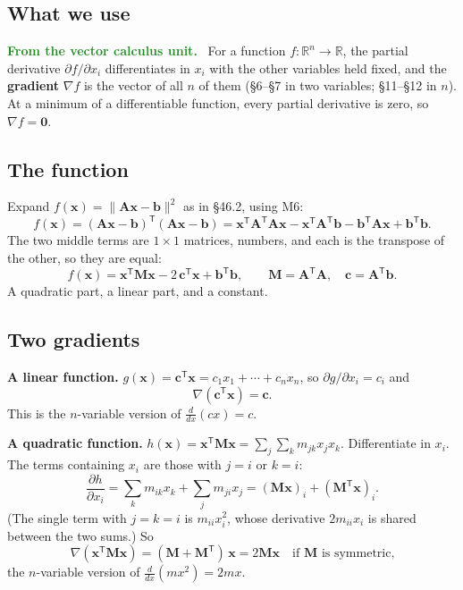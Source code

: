 \documentclass[11pt]{article}
\theoremstyle{plain}
\theoremstyle{definition}
\theoremstyle{remark}
\newcommand{\lookback}[1][the vector unit]{\par\smallskip\noindent
  \textbf{\sffamily\textcolor{ForestGreen}{From #1.}}\ \ignorespaces}
\newcommand{\R}{\mathbb{R}}
\newcommand{\vc}[1]{\mathbf{#1}}
\newcommand{\mt}[1]{\mathbf{#1}}
\newcommand{\norm}[1]{\lVert #1\rVert}
\newcommand{\T}{^{\mathsf{T}}}
\begin{document}
\subsection{What we use}
\lookback[the vector calculus unit] For a function $f:\R^{n}\to\R$, the partial
derivative $\partial f/\partial x_i$ differentiates in $x_i$ with the other
variables held fixed, and the \textbf{gradient} $\nabla f$ is the vector of all
$n$ of them (\S6--\S7 in two variables; \S11--\S12 in $n$). At a minimum of a
differentiable function, every partial derivative is zero, so $\nabla f=\vc{0}$.

\subsection{The function}
Expand $f(\vc{x})=\norm{\mt{A}\vc{x}-\vc{b}}^{2}$ as in \S46.2, using M6:
\[
  f(\vc{x})=(\mt{A}\vc{x}-\vc{b})\T(\mt{A}\vc{x}-\vc{b})
  =\vc{x}\T\mt{A}\T\mt{A}\vc{x}-\vc{x}\T\mt{A}\T\vc{b}-\vc{b}\T\mt{A}\vc{x}+\vc{b}\T\vc{b}.
\]
The two middle terms are $1\times1$ matrices, numbers, and each is the transpose
of the other, so they are equal:
\[
  f(\vc{x})=\vc{x}\T\mt{M}\vc{x}-2\,\vc{c}\T\vc{x}+\vc{b}\T\vc{b},
  \qquad \mt{M}=\mt{A}\T\mt{A},\quad \vc{c}=\mt{A}\T\vc{b}.
\]
A quadratic part, a linear part, and a constant.

\subsection{Two gradients}
\textbf{A linear function.} $g(\vc{x})=\vc{c}\T\vc{x}=c_1x_1+\cdots+c_nx_n$, so
$\partial g/\partial x_i=c_i$ and
\[
  \nabla(\vc{c}\T\vc{x})=\vc{c}.
\]
This is the $n$-variable version of $\frac{d}{dx}(cx)=c$.

\textbf{A quadratic function.} $h(\vc{x})=\vc{x}\T\mt{M}\vc{x}=\sum_{j}\sum_{k}m_{jk}x_jx_k$.
Differentiate in $x_i$. The terms containing $x_i$ are those with $j=i$ or $k=i$:
\[
  \frac{\partial h}{\partial x_i}
  =\sum_{k}m_{ik}x_k+\sum_{j}m_{ji}x_j
  =(\mt{M}\vc{x})_i+(\mt{M}\T\vc{x})_i .
\]
(The single term with $j=k=i$ is $m_{ii}x_i^{2}$, whose derivative $2m_{ii}x_i$ is
shared between the two sums.) So
\[
  \nabla(\vc{x}\T\mt{M}\vc{x})=(\mt{M}+\mt{M}\T)\,\vc{x}=2\mt{M}\vc{x}
  \quad\text{if }\mt{M}\text{ is symmetric,}
\]
the $n$-variable version of $\frac{d}{dx}(mx^{2})=2mx$.
\end{document}
